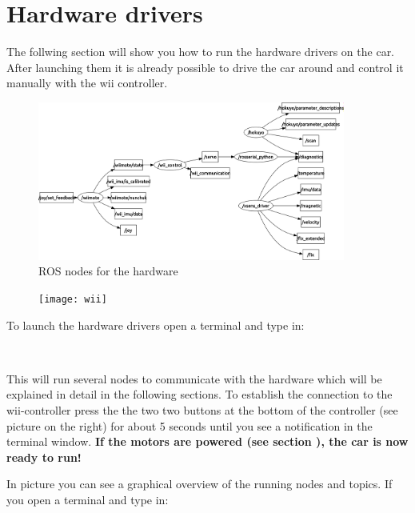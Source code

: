 \newpage
\section{Hardware drivers}
\label{sec:tas_package_drivers}
The follwing section will show you how to run the hardware drivers on the car. After launching them it is already possible to drive the car around and control it manually with the wii controller.

\begin{figure}[h]
	\centering
		\includegraphics[width=0.9\textwidth]{diagrams/rqt_hardware}
	\caption{ROS nodes for the hardware}
	\label{fig:rqt_hardware}
\end{figure}

\begin{figure}
  \begin{center}
    \texttt{[image: wii]}
		\caption{}
		\label{fig:wii_controller}
  \end{center}	
\end{figure}

To launch the hardware drivers open a terminal and type in:

\\

This will run several nodes to communicate with the hardware which will be explained in detail in the following sections. To establish the connection to the wii-controller press the the two two buttons at the bottom of the controller (see picture  on the right) for about 5 seconds until you see a notification in the terminal window. \textbf{If the motors are powered (see section ), the car is now ready to run!}

In picture  you can see a graphical overview of the running nodes and topics. If you open a terminal and type in:

